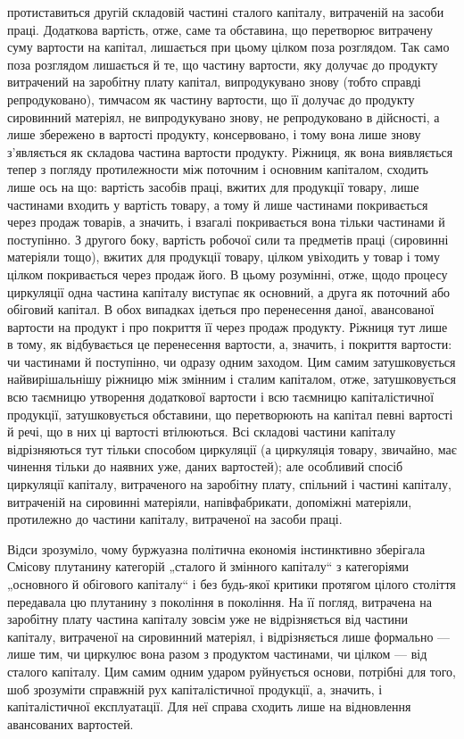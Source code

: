 \parcont{}  %
протиставиться другій складовій частині сталого капіталу, витраченій на
засоби праці. Додаткова вартість, отже, саме та обставина, що перетворює
витрачену суму вартости на капітал, лишається при цьому цілком
поза розглядом. Так само поза розглядом лишається й те, що частину
вартости, яку долучає до продукту витрачений на заробітну плату капітал,
випродукувано знову (тобто справді репродуковано), тимчасом як
частину вартости, що її долучає до продукту сировинний матеріял, не
випродукувано знову, не репродуковано в дійсності, а лише збережено
в вартості продукту, консервовано, і тому вона лише знову з’являється як
складова частина вартости продукту. Ріжниця, як вона виявляється тепер
з погляду протилежности між поточним і основним капіталом, сходить
лише ось на що: вартість засобів праці, вжитих для продукції товару,
лише частинами входить у вартість товару, а тому й лише частинами
покривається через продаж товарів, а значить, і взагалі покривається вона
тільки частинами й поступінно. З другого боку, вартість робочої
сили та предметів праці (сировинні матеріяли тощо), вжитих для
продукції товару, цілком увіходить у товар і тому цілком покривається
через продаж його. В цьому розумінні, отже, щодо процесу
циркуляції одна частина капіталу виступає як основний, а друга як поточний
або обіговий капітал. В обох випадках ідеться про перенесення
даної, авансованої вартости на продукт і про покриття її через продаж
продукту. Ріжниця тут лише в тому, як відбувається це перенесення вартости,
а, значить, і покриття вартости: чи частинами й поступінно, чи
одразу одним заходом. Цим самим затушковується найвирішальнішу ріжницю
між змінним і сталим капіталом, отже, затушковується всю таємницю
утворення додаткової вартости і всю таємницю капіталістичної продукції,
затушковується обставини, що перетворюють на капітал певні вартості
й речі, що в них ці вартості втілюються. Всі складові частини капіталу
відрізняються тут тільки способом циркуляції (а циркуляція товару,
звичайно, має чинення тільки до наявних уже, даних вартостей); але особливий
спосіб циркуляції капіталу, витраченого на заробітну плату, спільний і
частині капіталу, витраченій на сировинні матеріяли, напівфабрикати,
допоміжні матеріяли, протилежно до частини капіталу, витраченої на засоби
праці.

Відси зрозуміло, чому буржуазна політична економія інстинктивно
зберігала Смісову плутанину категорій „сталого й змінного капіталу“
з категоріями „основного й обігового капіталу“ і без будь-якої критики
протягом цілого століття передавала цю плутанину з покоління в покоління.
На її погляд, витрачена на заробітну плату частина капіталу зовсім
уже не відрізняється від частини капіталу, витраченої на сировинний
матеріял, і відрізняється лише формально — лише тим, чи циркулює вона
разом з продуктом частинами, чи цілком — від сталого капіталу. Цим
самим одним ударом руйнується основи, потрібні для того, шоб зрозуміти
справжній рух капіталістичної продукції, а, значить, і капіталістичної
експлуатації. Для неї справа сходить лише на відновлення авансованих
вартостей.
